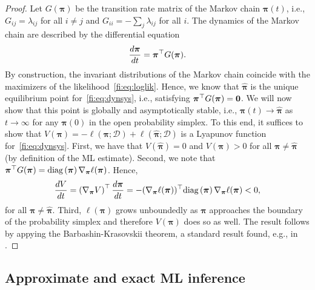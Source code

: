 \begin{proof}[Proof]
Let $G(\bm{\pi})$ be the transition rate matrix of the Markov chain $\bm{\pi}(t)$, i.e., $G_{ij} = \lambda_{ij}$ for all $i \ne j$ and  $G_{ii} = - \sum_{j} \lambda_{ij}$ for all $i$.
The dynamics of the Markov chain are described by the differential equation
\begin{align}
\label{fi:eq:dynsys}
\frac{d \bm{\pi}}{dt} = \bm{\pi}^\top G(\bm{\pi}).
\end{align}
By construction, the invariant distributions of the Markov chain coincide with the maximizers of the likelihood~\eqref{fi:eq:loglik}.
Hence, we know that $\hat{\bm{\pi}}$ is the unique equilibrium point for~\eqref{fi:eq:dynsys}, i.e., satisfying $\bm{\pi}^\top G(\bm{\pi}) = \bm{0}$.
We will now show that this point is globally and asymptotically stable, i.e., $\bm{\pi}(t) \to \hat{\bm{\pi}}$ as $t \to \infty$ for any $\bm{\pi}(0)$ in the open probability simplex.
To this end, it suffices to show that $V(\bm{\pi}) = - \ell(\bm{\pi} ; \mathcal{D}) + \ell(\hat{\bm{\pi}} ; \mathcal{D})$ is a Lyapunov function for~\eqref{fi:eq:dynsys}.
First, we have that $V(\hat{\bm{\pi}}) = 0$ and $V(\bm{\pi}) > 0$ for all $\bm{\pi} \ne \hat{\bm{\pi}}$ (by definition of the ML estimate).
Second, we note that $\bm{\pi}^\top G(\bm{\pi}) = \text{diag} \left( \bm{\pi} \right)  \nabla_{\bm{\pi}} \ell(\bm{\pi})$.
Hence,
\begin{align*}
\frac{dV}{dt}
    = \left( \nabla_{\bm{\pi}} V \right)^\top \frac{d \bm{\pi}}{dt}
    = - (\nabla_{\bm{\pi}} \ell(\bm{\pi}))^\top \text{diag} \left( \bm{\pi} \right)  \nabla_{\bm{\pi}} \ell(\bm{\pi})
    < 0,
\end{align*}
for all $\bm{\pi} \ne \hat{\bm{\pi}}$.
Third, $\ell(\bm{\pi})$ grows unboundedly as $\bm{\pi}$ approaches the boundary of the probability simplex \citep[Lemma~1]{hunter2004mm} and therefore $V(\bm{\pi})$ does so as well.
The result follows by appying the Barbashin-Krasovskii theorem, a standard result found, e.g., in \citet[Chapter~3]{khalil1996nonlinear}.
\end{proof}


\subsection{Approximate and exact ML inference}

